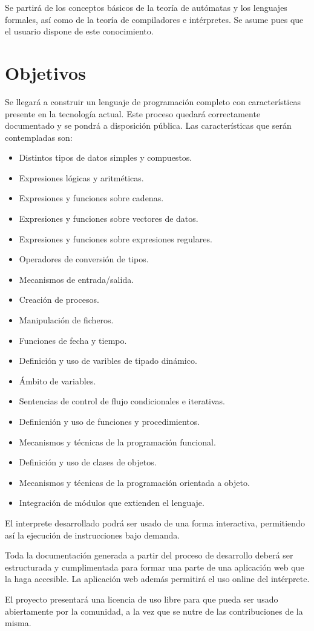 Se partirá de los conceptos básicos de la teoría de autómatas y los lenguajes formales, así como de la teoría de compiladores e intérpretes. Se asume pues que el usuario dispone
de este conocimiento.

\section{Objetivos}
Se llegará a construir un lenguaje de programación completo con características presente en la tecnología actual. Este proceso quedará correctamente documentado y se pondrá a disposición pública.
Las características que serán contempladas son:

\begin{itemize}
\item Distintos tipos de datos simples y compuestos.
\item Expresiones lógicas y aritméticas.
\item Expresiones y funciones sobre cadenas.
\item Expresiones y funciones sobre vectores de datos.
\item Expresiones y funciones sobre expresiones regulares.
\item Operadores de conversión de tipos.
\item Mecanismos de entrada/salida.
\item Creación de procesos.
\item Manipulación de ficheros.
\item Funciones de fecha y tiempo.
\item Definición y uso de varibles de tipado dinámico.
\item Ámbito de variables.
\item Sentencias de control de flujo condicionales e iterativas.
\item Definicnión y uso de funciones y procedimientos.
\item Mecanismos y técnicas de la programación funcional.
\item Definición y uso de clases de objetos.
\item Mecanismos y técnicas de la programación orientada a objeto.
\item Integración de módulos que extienden el lenguaje.
\end{itemize}

El interprete desarrollado podrá ser usado de una forma interactiva, permitiendo así la ejecución de
instrucciones bajo demanda. 

Toda la documentación generada a partir del proceso de desarrollo deberá ser estructurada y cumplimentada para 
formar una parte de una aplicación web que la haga accesible. La aplicación web además permitirá el uso online del 
intérprete.

El proyecto presentará una licencia de uso libre para que pueda ser usado abiertamente por la comunidad,  a la vez que 
se nutre de las contribuciones de la misma. 




  
 

 
 
